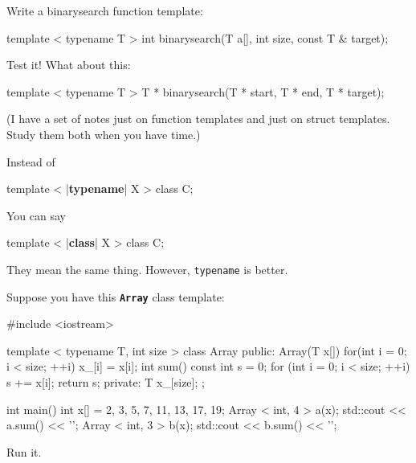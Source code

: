 \begin{ex}
Write a binarysearch function template:

\begin{console}
template  < typename T >
int binarysearch(T a[], int size, const T & target); 
\end{console}

Test it! What about this:

\begin{console}
template  < typename T >
T * binarysearch(T * start, T * end, T * target); 
\end{console}

(I have a set of notes just on function templates and just on struct templates. Study them both when you have time.)
\end{ex}

\newpage{}

Instead of

\begin{consolethree}[escapeinside=||]
template  < |\textbf{typename}| X >
class C{}; 
\end{consolethree}

You can say

\begin{consolethree}[escapeinside=||]
template  < |\textbf{class}| X >
class C{}; 
\end{consolethree}

They mean the same thing. However, \texttt{typename} is better.

\newpage{}

Suppose you have this \texttt{\textbf{Array}} class template:

\begin{console}
#include <iostream>

template < typename T, int size >
class Array
{
public:
     Array(T x[])
     {    
          for(int i = 0; i  < size; ++i)
          x_[i] = x[i];
     }
     int sum() const
     {
          int s = 0;
          for (int i = 0; i  < size; ++i)
          s += x[i];
          return s;
     }
private:
     T x_[size];
};

int main()
{    
     int x[] = {2, 3, 5, 7, 11, 13, 17, 19};
     Array < int, 4 > a(x);
     std::cout << a.sum() << '\n';
     Array < int, 3 > b(x);
     std::cout << b.sum() << '\n';
} 
\end{console}

Run it.

